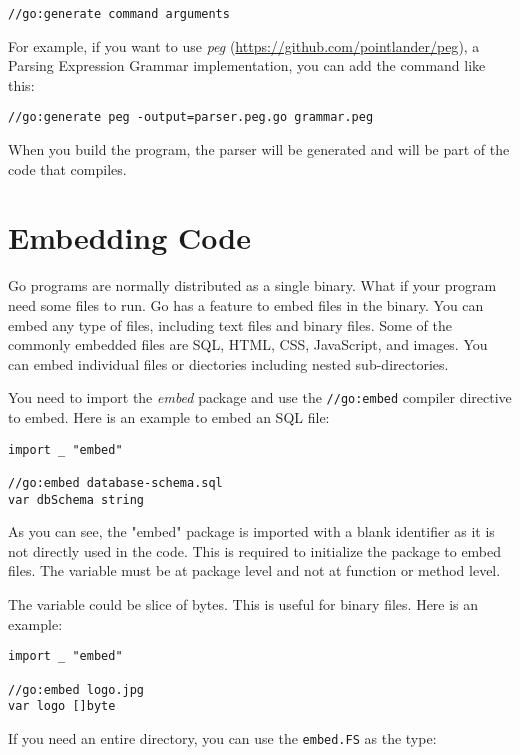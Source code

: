 \begin{lstlisting}[numbers=none]
//go:generate command arguments
\end{lstlisting}

For example, if you want to use \textit{peg}
(\url{https://github.com/pointlander/peg}), a Parsing Expression Grammar
implementation, you can add the command like this:

\begin{lstlisting}[numbers=none]
//go:generate peg -output=parser.peg.go grammar.peg
\end{lstlisting}

When you build the program, the parser will be generated and will be part of the
code that compiles.

\section{Embedding Code}

Go programs are normally distributed as a single binary. What if your program
need some files to run. Go has a feature to embed files in the binary. You can
embed any type of files, including text files and binary files. Some of the
commonly embedded files are SQL, HTML, CSS, JavaScript, and images. You can
embed individual files or diectories including nested sub-directories.

You need to import the \textit{embed} package and use the \texttt{//go:embed}
compiler directive to embed. Here is an example to embed an SQL file:

\begin{lstlisting}[numbers=none]
import _ "embed"

//go:embed database-schema.sql
var dbSchema string
\end{lstlisting}

As you can see, the "embed" package is imported with a blank identifier as it is
not directly used in the code. This is required to initialize the package to
embed files. The variable must be at package level and not at function or method
level.

The variable could be slice of bytes. This is useful for binary files. Here is
an example:

\begin{lstlisting}[numbers=none]
import _ "embed"

//go:embed logo.jpg
var logo []byte
\end{lstlisting}

If you need an entire directory, you can use the \texttt{embed.FS} as the type:

